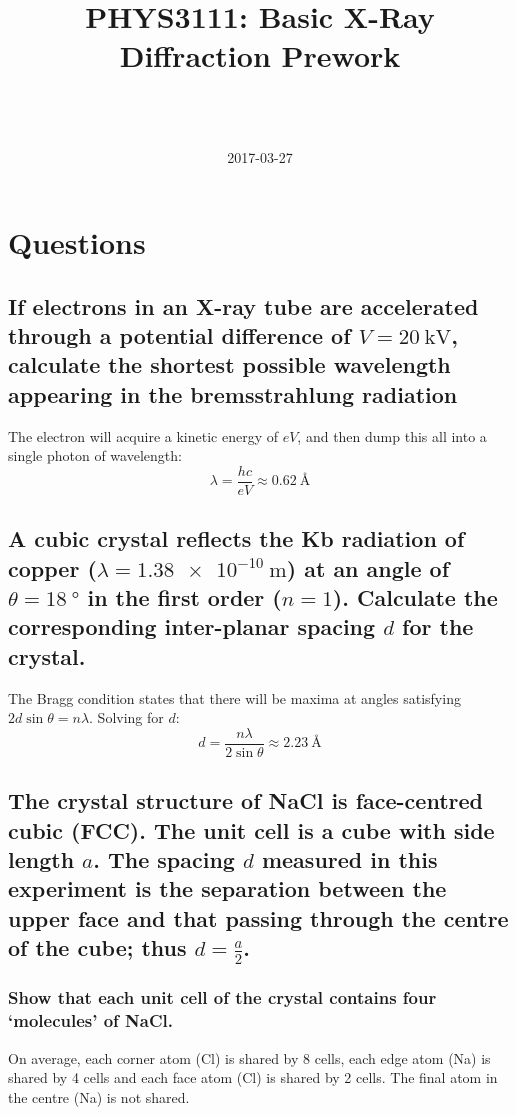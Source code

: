 \documentclass[a4paper]{scrartcl}
\begin{document}
\title{PHYS3111: Basic X-Ray Diffraction Prework}
\author{ \\ \\}
\date{2017-03-27}
\maketitle

\section{Questions}
\subsection{If electrons in an X-ray tube are accelerated through a potential difference of \(V = \SI{20}{\kilo\volt}\), calculate the shortest possible wavelength appearing in the bremsstrahlung radiation}
The electron will acquire a kinetic energy of \(e V\), and then dump this all into a single photon of wavelength:
\[\lambda = \frac{h c}{e V} \approx \SI{0.62}{\angstrom}\]

\subsection{A cubic crystal reflects the K\textgreek{b} radiation of copper (\(\lambda = \SI{1.38e-10}{\metre}\)) at an angle of \(\theta = \SI{18}{\degree}\) in the first order (\(n = 1\)). Calculate the corresponding inter-planar spacing \(d\) for the crystal.}
The Bragg condition states that there will be maxima at angles satisfying \(2 d \sin \theta = n \lambda\). Solving for \(d\):
\[d = \frac{n \lambda}{2 \sin \theta} \approx \SI{2.23}{\angstrom}\]

\subsection{The crystal structure of NaCl is face-centred cubic (FCC). The unit cell is a cube with side length \(a\). The spacing \(d\) measured in this experiment is the separation between the upper face and that passing through the centre of the cube; thus \(d = \frac{a}{2}\).}
\subsubsection{Show that each unit cell of the crystal contains four `molecules' of NaCl.}
On average, each corner atom (Cl) is shared by 8 cells, each edge atom (Na) is shared by 4 cells and each face atom (Cl) is shared by 2 cells. The final atom in the centre (Na) is not shared.
\end{document}

